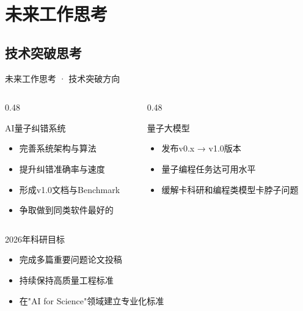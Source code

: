 \documentclass[aspectratio=169,11pt]{beamer}
\begin{document}
\section{未来工作思考}

\subsection{技术突破思考}
\begin{frame}{未来工作思考 · 技术突破方向}
    \begin{columns}[T]
        \begin{column}{0.48\textwidth}
            \begin{block}{\small AI量子纠错系统}
                \begin{itemize}
                    \footnotesize
                    \item 完善系统架构与算法
                    \item 提升纠错准确率与速度
                    \item 形成v1.0文档与Benchmark
                    \item 争取做到同类软件最好的
                \end{itemize}
            \end{block}
        \end{column}
        \begin{column}{0.48\textwidth}
            \begin{block}{\small 量子大模型}
                \begin{itemize}
                    \footnotesize
                    \item 发布v0.x → v1.0版本
                    \item 量子编程任务达可用水平
                    \item 缓解卡科研和编程类模型卡脖子问题
                \end{itemize}
            \end{block}
        \end{column}
    \end{columns}
    
    \vspace{0.3cm}
    
    \begin{block}{2026年科研目标}
        \begin{itemize}
            \item 完成多篇重要问题论文投稿
            \item 持续保持高质量工程标准
            \item 在"AI for Science"领域建立专业化标准
        \end{itemize}
    \end{block}
\end{frame}
\end{document}
